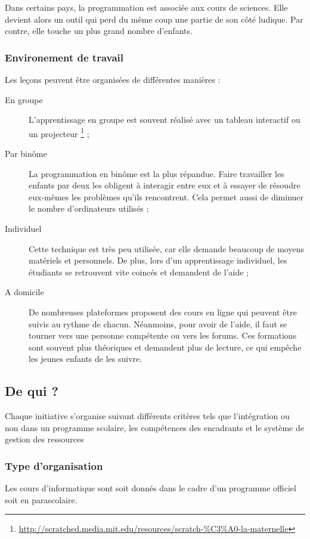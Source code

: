 Dans certains pays, la programmation est associée aux cours de sciences. Elle devient alors un outil qui perd du même coup une partie de son côté ludique. Par contre, elle touche un plus grand nombre d'enfants.\\

\subsubsection{Environement de travail}
\label{paire}
Les leçons peuvent être organisées de différentes manières :
\begin{description}
  \item[En groupe] L'apprentissage en groupe est souvent réalisé avec un tableau interactif ou un projecteur \footnote{\url{http://scratched.media.mit.edu/resources/scratch-\%C3\%A0-la-maternelle}} ;
  \item[Par binôme] La programmation en binôme est la plus répandue. Faire travailler les enfants par deux les obligent à interagir entre eux et à essayer de résoudre eux-mêmes les problèmes qu'ils rencontrent. Cela permet aussi de diminuer le nombre d'ordinateurs utilisés ;
  \item[Individuel] Cette technique est très peu utilisée, car elle demande beaucoup de moyens matériels et personnels. De plus, lors d'un apprentissage individuel, les étudiants se retrouvent vite coincés et demandent de l'aide ;
  \item[A domicile] De nombreuses plateformes proposent des cours en ligne qui peuvent être suivis au rythme de chacun. Néanmoins, pour avoir de l'aide, il faut se tourner vers une personne compétente ou vers les forums. Ces formations sont souvent plus théoriques et demandent plus de lecture, ce qui empêche les jeunes enfants de les suivre.
\end{description}

\subsection{De qui ?}
Chaque initiative s'organise suivant différents critères tels que l'intégration ou non dans un programme scolaire, les compétences des encadrants et le système de gestion des ressources

\subsubsection{Type d'organisation}
Les cours d'informatique sont soit donnés dans le cadre d'un programme officiel soit en parascolaire.

